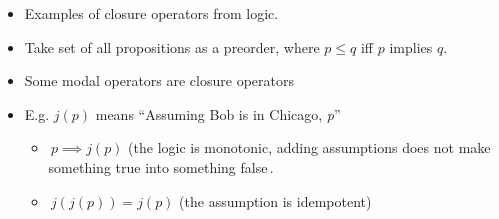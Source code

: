 
\begin{itemize}
    \item Examples of closure operators from logic.
    \item Take set of all propositions as a preorder, where $p \leq q$ iff $p$ implies $q$.
    \item Some modal operators are closure operators
    \item E.g. $j(p)$ means ``Assuming Bob is in Chicago, \emph{p}''
          \begin{itemize}
            \item \,$p \implies j(p)$ (the logic is monotonic, adding assumptions does not make something true into something false\,.
            \item \,$j(j(p)) = j(p)$ (the assumption is idempotent)\,
          \end{itemize}
  \end{itemize}